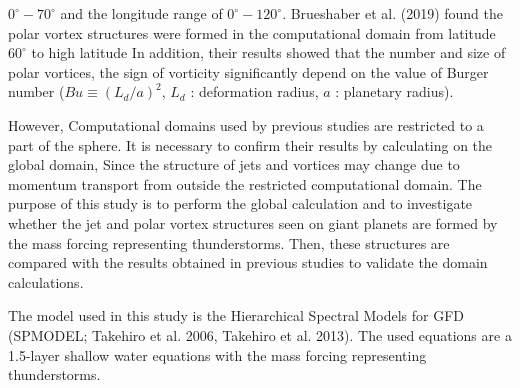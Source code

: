 \documentclass[a4j,8pt]{jarticle}
\begin{document}
$0^\circ - 70^\circ$ and the longitude range of $0^\circ - 120^\circ$.
%
Brueshaber et al. (2019) found the polar vortex structures were formed
in the computational domain from latitude $60^\circ$ to high latitude
%
In addition, their results showed
that the number and size of polar vortices,
the sign of vorticity significantly depend on
the value of Burger number ($Bu \equiv (L_d/a)^2$, $L_d$ : deformation radius, $a$ : planetary radius).

However, Computational domains used by previous studies are restricted to a part of the sphere.
It is necessary to confirm their results by calculating on the global domain, 
Since the structure of jets and vortices may change due to momentum transport from
outside the restricted computational domain.
%
The purpose of this study is to perform the global calculation and to investigate
whether the jet and polar vortex structures seen on giant planets 
are formed by the mass forcing representing thunderstorms.
%
Then, these structures are compared with the results obtained in previous studies
to validate the domain calculations.

The model used in this study is the Hierarchical Spectral Models for GFD (SPMODEL; Takehiro et al. 2006, Takehiro et al. 2013).
%
The used equations are a 1.5-layer shallow water equations
with the mass forcing representing thunderstorms.
%
\end{document}
